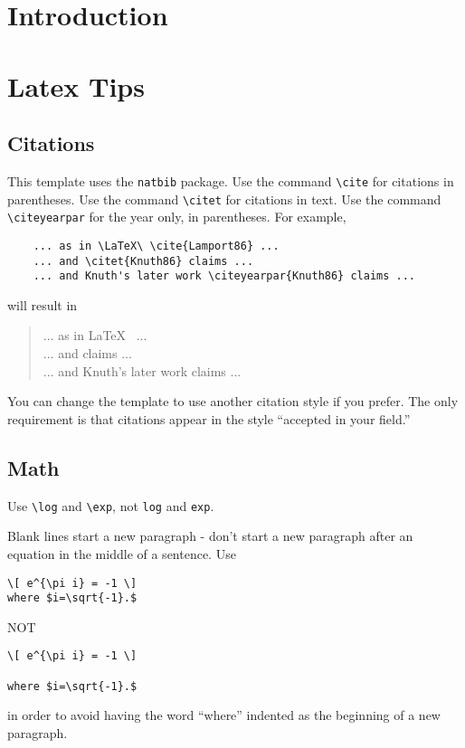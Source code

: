 \documentclass[12pt,leqno]{report}
\begin{document}
\chapter{Introduction}

\chapter{Latex Tips}

\section{Citations}

This template uses the \verb|natbib|
package.
Use the command \verb|\cite| for citations in parentheses.
Use the command \verb|\citet| for citations in text.
Use the command \verb|\citeyearpar| for the year only, in parentheses.
For example,
\begin{verbatim}
    ... as in \LaTeX\ \cite{Lamport86} ...
    ... and \citet{Knuth86} claims ...
    ... and Knuth's later work \citeyearpar{Knuth86} claims ...
\end{verbatim}
will result in
\begin{quote}
... as in \LaTeX\ \cite{Lamport86} ...\\
... and \citet{Knuth86} claims ...\\
... and Knuth's later work \citeyearpar{Knuth86} claims ...
\end{quote}

You can change the template to use another citation style if you prefer.  The only requirement is that citations appear in the style ``accepted in your field.''

\section{Math}

Use \verb|\log| and \verb|\exp|, not \verb|log| and \verb|exp|.

Blank lines start a new paragraph - don't start
a new paragraph after an equation in the middle of a sentence.
Use
\begin{verbatim}
\[ e^{\pi i} = -1 \]
where $i=\sqrt{-1}.$ 
\end{verbatim}
NOT
\begin{verbatim}
\[ e^{\pi i} = -1 \]

where $i=\sqrt{-1}.$ 
\end{verbatim}
in order to avoid having the word ``where'' indented as the
beginning of a new paragraph.
\end{document}
